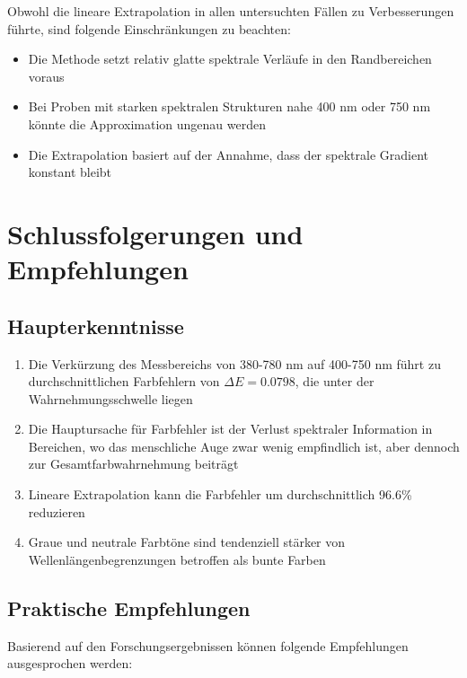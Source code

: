 Obwohl die lineare Extrapolation in allen untersuchten Fällen zu Verbesserungen führte, sind folgende Einschränkungen zu beachten:

\begin{itemize}
    \item Die Methode setzt relativ glatte spektrale Verläufe in den Randbereichen voraus
    \item Bei Proben mit starken spektralen Strukturen nahe 400 nm oder 750 nm könnte die Approximation ungenau werden
    \item Die Extrapolation basiert auf der Annahme, dass der spektrale Gradient konstant bleibt
\end{itemize}

\section{Schlussfolgerungen und Empfehlungen}

\subsection{Haupterkenntnisse}

\begin{enumerate}
    \item Die Verkürzung des Messbereichs von 380-780 nm auf 400-750 nm führt zu durchschnittlichen Farbfehlern von $\Delta E = 0.0798$, die unter der Wahrnehmungsschwelle liegen
    
    \item Die Hauptursache für Farbfehler ist der Verlust spektraler Information in Bereichen, wo das menschliche Auge zwar wenig empfindlich ist, aber dennoch zur Gesamtfarbwahrnehmung beiträgt
    
    \item Lineare Extrapolation kann die Farbfehler um durchschnittlich 96.6\% reduzieren
    
    \item Graue und neutrale Farbtöne sind tendenziell stärker von Wellenlängenbegrenzungen betroffen als bunte Farben
\end{enumerate}

\subsection{Praktische Empfehlungen}

Basierend auf den Forschungsergebnissen können folgende Empfehlungen ausgesprochen werden:

